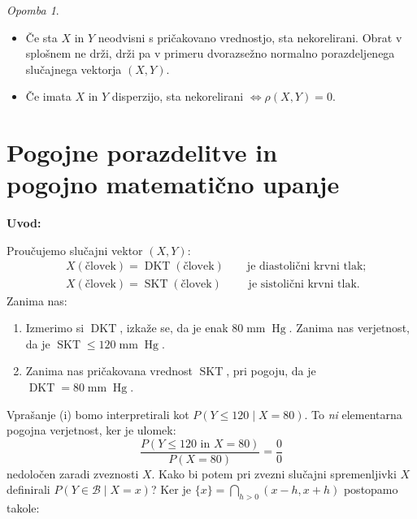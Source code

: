 \documentclass[12pt]{book}
\def\n{\noindent}
\theoremstyle{definition}
\theoremstyle{plain}
\theoremstyle{plain}
\theoremstyle{plain}
\theoremstyle{remark}
\newtheorem*{opomba}{Opomba}
\begin{document}
\begin{opomba}
    ~

    \begin{itemize}
        \item Če sta $X$ in $Y$ neodvisni s pričakovano vrednostjo, sta nekorelirani. Obrat v splošnem ne drži, drži pa v primeru dvorazsežno normalno porazdeljenega slučajnega vektorja $(X,Y)$.
        \item Če imata $X$ in $Y$ disperzijo, sta nekorelirani $\iff \rho(X,Y) = 0$.
    \end{itemize}
\end{opomba}

\chapter[Pogojne porazdelitve in pogojno matematično upanje]{Pogojne porazdelitve in \\ pogojno matematično upanje}

\n \textbf{Uvod:}

\n Proučujemo slučajni vektor $(X, Y)$: 
$$
\begin{aligned}
    &X(\text{človek}) = \operatorname{DKT}(\text{človek}) \qquad \text{je diastolični krvni tlak;} \\
    &X(\text{človek}) = \operatorname{SKT}(\text{človek}) \qquad \text{ je sistolični krvni tlak.}
\end{aligned}
$$
Zanima nas: 
\begin{enumerate}[label=(\roman*)]
    \item Izmerimo si $\operatorname{DKT}$, izkaže se, da je enak $80 \operatorname{mm} \operatorname{Hg}$. Zanima nas verjetnost, da je $\operatorname{SKT} \leq 120 \operatorname{mm} \operatorname{Hg}$.
    \item Zanima nas pričakovana vrednost $\operatorname{SKT}$, pri pogoju, da je $\operatorname{DKT} = 80 \operatorname{mm} \operatorname{Hg}$.
\end{enumerate}
 
\n Vprašanje (i) bomo interpretirali kot $P(Y \leq 120 \mid X=80)$. To \emph{ni} elementarna pogojna verjetnost, ker je ulomek: 
$$
\frac{P(Y \leq 120 \text { in } X=80)}{P(X=80)}=\frac{0}{0}
$$
nedoločen zaradi zveznosti $X$. Kako bi potem pri zvezni slučajni spremenljivki $X$ definirali $P(Y \in \mathcal{B} \mid X=x)$? Ker je $\{x\}=\bigcap_{h>0}(x-h, x+h)$ postopamo takole:
\end{document}
